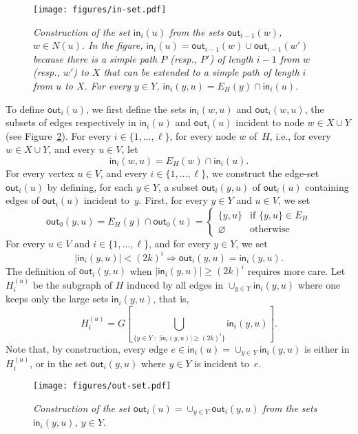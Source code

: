 \documentclass{article}
\newcommand{\F}{{\mathsf{out}}}
\renewcommand{\H}{{\mathsf{in}}}
\newcommand{\bp}{X}
\newcommand{\tp}{Y}
\begin{document}
\begin{figure}
    \centerline{\texttt{[image: figures/in-set.pdf]}}
    \caption{\sl Construction of the set $\H_i(u)$ from the sets $\F_{i-1}(w)$, $w\in N(u)$. In the figure, $\H_i(u)=\F_{i-1}(w) \cup \F_{i-1}(w')$ because there is a simple path $P$ (resp., $P'$) of length $i-1$ from $w$ (resp., $w'$) to $X$ that can be extended to a simple path of length $i$ from $u$ to $X$. For every $y\in Y$, $\H_i(y,u)=E_H(y)\cap\H_i(u)$. }
    \label{fig:in-set}
\end{figure}

To define $\F_i(u)$, we first define the sets $\H_i(w,u)$ and $\F_i(w,u)$, the subsets of edges respectively in $\H_i(u)$ and $\F_i(u)$ incident to node $w\in  \bp\cup \tp$ (see Figure~\ref{fig:out-set}). For every $i\in\{1,\dots,\ell\}$, for every node $w$ of~$H$, i.e., for every $w\in \bp\cup \tp$, and every $u\in V$, let
\begin{equation}\label{eq:inx-equal-iny}
\H_i(w,u)=E_H(w)\cap\H_i(u). 
\end{equation}
For every vertex $u\in V$, and every $i \in  \{1,\dots,\ell\}$, we construct the edge-set $\F_i(u)$ by defining, for each $y\in \tp$, a subset $\F_i(y,u)$ of $\F_i(u)$ containing edges of $\F_i(u)$ incident to~$y$.
First, for every $y \in \tp$ and $u\in V$, we set 
\[
\F_0(y,u)=E_H(y)\cap\F_0(u)=\left\{\begin{array}{cl}
    \{y,u\} & \mbox{if $\{y,u\}\in E_H$} \\
    \varnothing & \mbox{otherwise}
    \end{array}\right.
\]
For every $u\in V$ and $i\in \{1,\dots,\ell\}$, and for every $y \in \tp$, we set
\begin{equation}\label{eq:OUT_recur}
    |\H_i(y,u)|<(2k)^i \Longrightarrow \F_i(y,u)= \H_i(y,u).
\end{equation}
The definition of $\F_i(y,u)$ when  $|\H_i(y,u)|\geq (2k)^i$ requires more care. 
Let $H_i^{(u)}$ be the subgraph of $H$ induced by all edges in $\cup_{y\in \tp}\H_i(y,u)$ where one keeps only the large sets $\H_i(y,u)$, that is, 
\begin{equation}\label{eq:H_i}
    H_i^{(u)} = G\left[\bigcup_{\{y\in \tp\;:\; |\H_i(y,u)|\geq (2k)^i\}}\H_i(y,u)\right].
\end{equation}
Note that, by construction, every edge $e\in \H_i(u)=\cup_{y\in \tp}\H_i(y,u)$ is either in $H_i^{(u)}$, or in the set $\F_i(y,u)$ where $y\in \tp$ is incident to~$e$.

\begin{figure}
    \centerline{\texttt{[image: figures/out-set.pdf]}}
    \caption{\sl Construction of the set $\F_i(u)=\cup_{y\in Y}\F_i(y,u)$ from the sets $\H_i(y,u)$, $y\in Y$.}
    \label{fig:out-set}
\end{figure}
\end{document}
